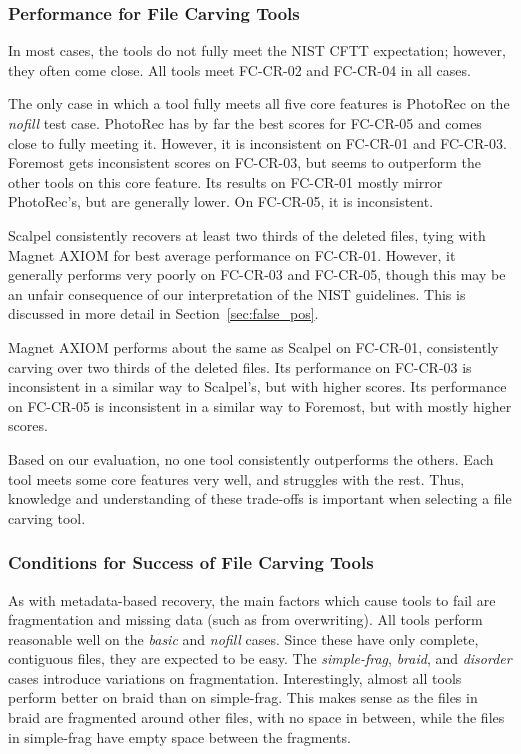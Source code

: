 \subsubsection{Performance for File Carving Tools}

In most cases, the tools do not fully meet the NIST CFTT expectation; however, they often come close.
All tools meet FC-CR-02 and FC-CR-04 in all cases.

The only case in which a tool fully meets all five core features is PhotoRec on the \emph{nofill} test case.
PhotoRec has by far the best scores for FC-CR-05 and comes close to fully meeting it.
However, it is inconsistent on FC-CR-01 and FC-CR-03.
Foremost gets inconsistent scores on FC-CR-03, but seems to outperform the other tools on this core feature.
Its results on FC-CR-01 mostly mirror PhotoRec's, but are generally lower.
On FC-CR-05, it is inconsistent.

Scalpel consistently recovers at least two thirds of the deleted files, tying with Magnet AXIOM for best average performance on FC-CR-01.
However, it generally performs very poorly on FC-CR-03 and FC-CR-05, though this may be an unfair consequence of our interpretation of the NIST guidelines.
This is discussed in more detail in Section~\ref{sec:false_pos}.

Magnet AXIOM performs about the same as Scalpel on FC-CR-01, consistently carving over two thirds of the deleted files.
Its performance on FC-CR-03 is inconsistent in a similar way to Scalpel's, but with higher scores.
Its performance on FC-CR-05 is inconsistent in a similar way to Foremost, but with mostly higher scores.

Based on our evaluation, no one tool consistently outperforms the others.
Each tool meets some core features very well, and struggles with the rest.
Thus, knowledge and understanding of these trade-offs is important when selecting a file carving tool.




\subsubsection{Conditions for Success of File Carving Tools}

As with metadata-based recovery, the main factors which cause tools to fail are fragmentation and missing data (such as from overwriting).
All tools perform reasonable well on the \emph{basic} and \emph{nofill} cases.
Since these have only complete, contiguous files, they are expected to be easy.
The \emph{simple-frag}, \emph{braid}, and \emph{disorder} cases introduce variations on fragmentation.
Interestingly, almost all tools perform better on braid than on simple-frag.
This makes sense as the files in braid are fragmented around other files, with no space in between, while the files in simple-frag have empty space between the fragments.

